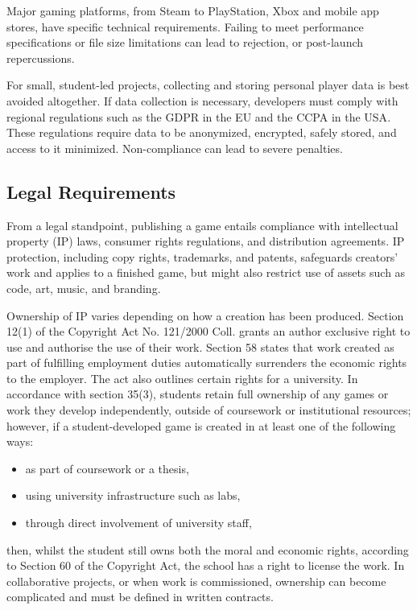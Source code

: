 Major gaming platforms, from Steam to PlayStation, Xbox and mobile app stores, have specific technical requirements. Failing to meet performance specifications or file size limitations can lead to rejection, or post-launch repercussions.
\cite{apple-ios-apps}

For small, student-led projects, collecting and storing personal player data is best avoided altogether. If data collection is necessary, developers must comply with regional regulations such as the GDPR in the EU and the CCPA in the USA\cite{eu_gdpr, doj_ccpa}. These regulations require data to be anonymized, encrypted, safely stored, and access to it minimized. Non-compliance can lead to severe penalties.
\cite{silva_guide-to-release}

\subsection{Legal Requirements}
From a legal standpoint, publishing a game entails compliance with intellectual property (IP) laws, consumer rights regulations, and distribution agreements. IP protection, including copy rights, trademarks, and patents, safeguards creators’ work and applies to a finished game, but might also restrict use of assets such as code, art, music, and branding.
\cite{jd-supra_ip}

Ownership of IP varies depending on how a creation has been produced. Section 12(1) of the Copyright Act No. 121/2000 Coll. grants an author exclusive right to use and authorise the use of their work. Section 58 states that work created as part of fulfilling employment duties automatically surrenders the economic rights to the employer. The act also outlines certain rights for a university. In accordance with section 35(3), students retain full ownership of any games or work they develop independently, outside of coursework or institutional resources; however, if a student-developed game is created in at least one of the following ways:
\begin{itemize}
	\item as part of coursework or a thesis,
	\item using university infrastructure such as labs,
	\item through direct involvement of university staff,
\end{itemize}
then, whilst the student still owns both the moral and economic rights, according to Section 60 of the Copyright Act, the school has a right to license the work. In collaborative projects, or when work is commissioned, ownership can become complicated and must be defined in written contracts.
\cite{Kurzy_autorsky-zakon, silva_guide-to-release, jd-supra_ip}

